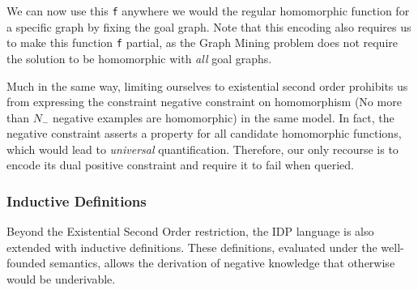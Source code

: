 \documentclass{article}
\theoremstyle{definition}
\begin{document}
We can now use this \verb|f| anywhere we would the regular homomorphic function for a specific graph by fixing the goal graph.
Note that this encoding also requires us to make this function \verb|f| partial, as the Graph Mining problem does not require the solution to be homomorphic with \emph{all} goal graphs.

Much in the same way, limiting ourselves to existential second order prohibits us from expressing the constraint negative constraint on homomorphism (No more than $N_{-}$ negative examples are homomorphic) in the same model.
In fact, the negative constraint asserts a property for all candidate homomorphic functions, which would lead to \emph{universal} quantification.
Therefore, our only recourse is to encode its dual positive constraint and require it to fail when queried.

\subsubsection{Inductive Definitions}
Beyond the Existential Second Order restriction, the IDP language is also extended with inductive definitions. These definitions, evaluated under the well-founded semantics, allows the derivation of negative knowledge that otherwise would be underivable.
\reversemarginpar
{}
\end{document}
